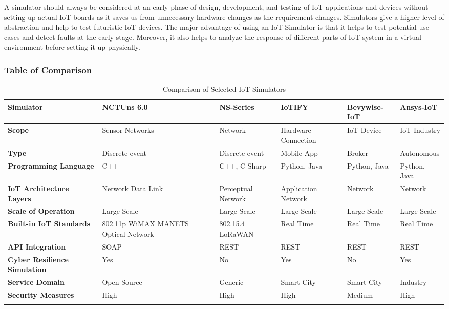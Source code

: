 \documentclass[a4paper,11pt]{article}
\begin{document}
\begin{iotsolution}


A simulator should always be considered at an early phase of design, development, and testing of IoT applications and devices without setting up actual IoT boards as it saves us from unnecessary hardware changes as the requirement changes. Simulators give a higher level of abstraction and help to test futuristic IoT devices. The major advantage of using an IoT Simulator is that it helps to test potential use cases and detect faults at the early stage. Moreover, it also helps to analyze the response of different parts of IoT system in a virtual environment before setting it up physically.


\subsubsection*{Table of Comparison}
\begin{center}
 \label{tab:title2}
\begin{longtable}{|p{2.5cm} |p{2.5cm} |p{2cm} |p{2cm} |p{2cm} |p{2cm} |}
\hline
\textbf{Simulator} &  NCTUns 6.0 & NS-Series&IoTIFY & Bevywise-IoT & Ansys-IoT \\
\hline
\textbf{Scope} & Sensor Networks & Network & Hardware Connection & IoT Device & IoT Industry\\
\hline
\textbf{Type}  & Discrete-event & Discrete-event & Mobile App & Broker & Autonomous\\
\hline
\textbf{Programming Language} & C++ & C++, C Sharp & Python, Java & Python, Java & Python, Java\\
\hline
\textbf{IoT Architecture Layers} &Network Data Link &Perceptual Network & Application Network
 & Network & Network \\
 \hline
\textbf{Scale of Operation} & Large Scale & Large Scale & Large Scale & Large Scale & Large Scale	\\
\hline
\textbf{Built-in IoT Standards} & 802.11p WiMAX MANETS Optical Network
 & 802.15.4 LoRaWAN & Real Time & Real Time & Real Time \\
 \hline
\textbf{API Integration} & SOAP & REST & REST & REST & REST\\
\hline
\textbf{Cyber Resilience Simulation} & Yes & No & Yes & No & Yes \\
\hline
\textbf{Service Domain} & Open Source &Generic &Smart City &Smart City & Industry\\
\hline
\textbf{Security Measures} & High & High & High & Medium & High\\
\hline
\caption{Comparison of Selected IoT Simulators \cite{Simulators}}
\end{longtable}


\end{center}
\end{iotsolution}
\end{document}

